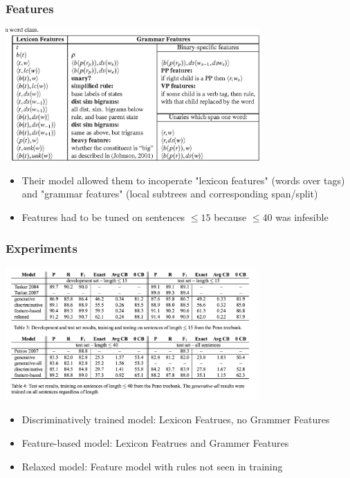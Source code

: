 \documentclass{beamer}
\begin{document}
\begin{frame}
  \frametitle{Features}
  \includegraphics[height=2in]{features.png}
  \begin{itemize}
    \item Their model allowed them to incoperate "lexicon features" (words over tags) and
          "grammar features" (local subtrees and corresponding span/split)
    \item Features had to be tuned on sentences $\leq 15$ because $\leq 40$ was infesible
  \end{itemize}
\end{frame}
  
\begin{frame}
  \frametitle{Experiments}
  \includegraphics[height=2in]{results.png}

  \begin{itemize}
    \item Discriminatively trained model: Lexicon Featrues, no Grammer Features
    \item Feature-based model: Lexicon Featrues and Grammer Features
    \item Relaxed model: Feature model with rules not seen in training
  \end{itemize}
\end{frame}
\end{document}
